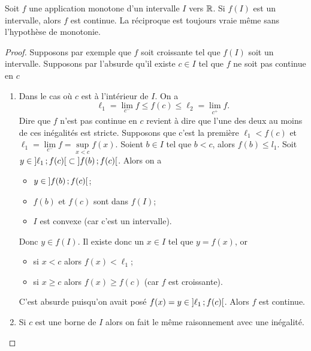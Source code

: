 \begin{theo}\label{theo:monotone-intervalle-donc-continue}
  Soit \(f\) une application monotone d'un intervalle \(I\) vers \(\mathbb{R}\). Si
  \(f(I)\) est un intervalle, alors \(f\) est continue. La réciproque est
  toujours vraie même sans l'hypothèse de monotonie.
\end{theo}
\begin{proof}
  Supposons par exemple que \(f\) soit croissante tel que \(f(I)\) soit un
  intervalle. Supposons par l'absurde qu'il existe \(c \in I\) tel que \(f\) ne
  soit pas continue en \(c\)
  \begin{enumerate}
    \item Dans le cas où \(c\) est à l'intérieur de \(I\). On a
      \begin{equation}
        \ell_1 = \lim\limits_{c^{-}}f \leqslant f(c) \leqslant \ell_2 =
        \lim\limits_{c^{+}}f.
      \end{equation}
      Dire que \(f\) n'est pas continue en \(c\) revient à dire que l'une des
      deux au moins de ces inégalités est stricte. Supposons que c'est la
      première \(\ell_1 < f(c)\) et \(\ell_1 = \lim\limits_{c^{-}}f =
      \sup\limits_{x < c} f(x)\). Soient \(b \in I\) tel que \(b < c\), alors
      \(f(b) \leqslant l_1\). Soit \(y \in \left] \ell_1 \, ; {} f(c) \right[ \subset
      \left] f(b) \, ; {} f(c) \right[\). Alors on a
      \begin{itemize}
        \item \(y \in \left] f(b) \, ; {} f(c) \right[\);
        \item \(f(b)\) et \(f(c)\) sont dans \(f(I)\);
        \item \(I\) est convexe (car c'est un intervalle).
      \end{itemize}
      Donc \(y \in f(I)\). Il existe donc un \(x \in I\) tel que \(y=f(x)\), or
      \begin{itemize}
        \item si \(x < c\) alors \(f(x) < \ell_1\);
        \item si \(x \geqslant c\) alors \(f(x) \geqslant f(c)\) (car \(f\) est
          croissante).
      \end{itemize}
      C'est absurde puisqu'on avait posé \(f(x)=y \in
      \left] \ell_1 \, ; {} f(c) \right[\). Alors \(f\) est continue.
    \item Si \(c\) est une borne de \(I\) alors on fait le même raisonnement
      avec une inégalité.
  \end{enumerate}
\end{proof}


